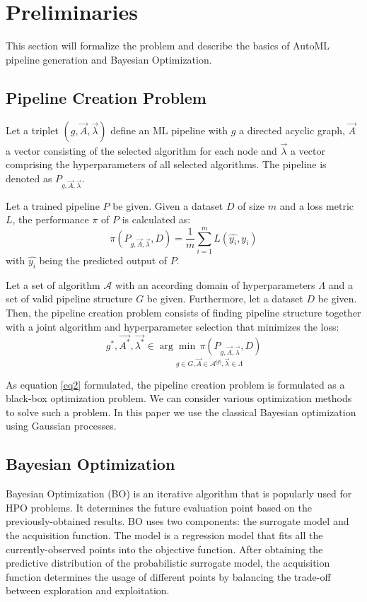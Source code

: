 \documentclass[review]{elsarticle}
\begin{document}
\section{Preliminaries}
This section will formalize the problem and describe the basics of AutoML pipeline generation and Bayesian Optimization. 

\subsection{Pipeline Creation Problem}
Let a triplet $ (g,\vec{A},\vec{\lambda}) $ define an ML pipeline with $ g $ a directed acyclic graph, $ \vec{A} $ a vector consisting of the selected algorithm for each node and $ \vec{\lambda} $ a vector comprising the hyperparameters of all selected algorithms. The pipeline is denoted as $ P_{g,\vec{A},\vec{\lambda}} $.

Let a trained pipeline $ P $ be given. Given a dataset $ D $ of size $ m $ and a loss metric $ L $, the performance $ \pi $ of $ P $ is calculated as:
\begin{equation}\label{eq1} \pi(P_{g,\vec{A},\vec{\lambda}},D)=\frac{1}{m}\sum_{i=1}^{m}L(\hat{y_i},y_i) 
\end{equation} with $ \hat{y_i} $ being the predicted output of $ P $.

Let a set of algorithm $ \mathcal{A} $ with an according domain of hyperparameters $ \Lambda $ and a set of valid pipeline structure $ G $ be given. Furthermore, let a dataset $ D $ be given. Then, the pipeline creation problem consists of finding pipeline structure together with a joint algorithm and hyperparameter selection that minimizes the loss:
\begin{equation}\label{eq2}
g^*,\vec{A^*},\vec{\lambda^*} \in {\underset{g \in G,\vec{A} \in \mathcal{A}^{|g|},\vec{\lambda} \in \Lambda}{{\arg\min}\, \pi({P_{g,\vec{A},\vec{\lambda}},D})}}
\end{equation}

As equation \ref{eq2} formulated, the pipeline creation problem is formulated as a black-box optimization problem. We can consider various optimization methods to solve such a problem. In this paper we use the classical Bayesian optimization using Gaussian processes.
\subsection{Bayesian Optimization}
Bayesian Optimization (BO) is an iterative algorithm that is popularly used for HPO problems. It determines the future evaluation point based on the previously-obtained results\cite{yang2020hyperparameter}. BO uses two components: the surrogate model and the acquisition function. The model is a regression model that fits all the currently-observed points into the objective function. After obtaining the predictive distribution of the probabilistic surrogate model, the acquisition function determines the usage of different points by balancing the trade-off between exploration and exploitation.
\end{document}

